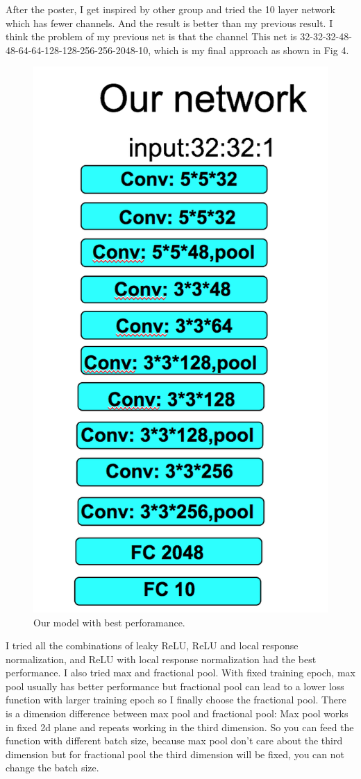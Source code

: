 \documentclass[twocolumn]{webofc}
\begin{document}
After the poster, I get inspired by other group and tried the 10 layer network which has fewer channels. And the result is better than my previous result. I think the problem of my previous net is that the channel This net is 32-32-32-48-48-64-64-128-128-256-256-2048-10, which is my final approach as shown in Fig 4.




\begin{figure}[H]
  \centering
  \includegraphics[width=0.6\columnwidth]{ourmodel.png}
  \caption{Our model with best perforamance.}
\end{figure}







I tried all the combinations of leaky ReLU, ReLU and local response normalization, and ReLU with local response normalization had the best performance. I also tried max and fractional pool. With fixed training epoch, max pool usually has better performance but fractional pool can lead to a lower loss function with larger training epoch so I finally choose the fractional pool. There is a dimension difference between max pool and fractional pool: Max pool works in fixed 2d plane and repeats working in the third dimension. So you can feed the function with different batch size, because max pool don't care about the third dimension but for fractional pool the third dimension will be fixed, you can not change the batch size. 
\end{document}
